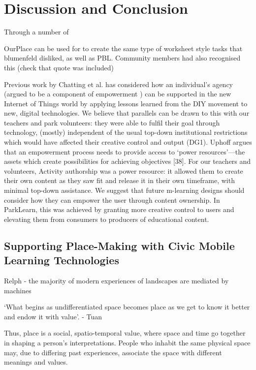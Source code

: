 \chapter{Discussion and Conclusion}

Through a number of 

OurPlace can be used for to create the same type of worksheet style tasks that blumenfeld disliked, as well as PBL. Community members had also recognised this (check that quote was included) 

Previous work by Chatting et al. \citep{Chatting2017} has considered how an individual’s agency (argued to be a component of empowerment \citep{Ibrahim2007}) can be supported in the new Internet of Things world by applying lessons learned from the DIY movement to new, digital technologies. We believe that parallels can be drawn to this with our teachers and park volunteers: they were able to fulfil their goal through technology, (mostly) independent of the usual top-down institutional restrictions which would have affected their creative control and output (DG1). Uphoff argues that an empowerment process needs to provide access to ‘power resources’—the assets which create possibilities for achieving objectives [38]. For our teachers and volunteers, Activity authorship was a power resource: it allowed them to create their own content as they saw fit and release it in their own timeframe, with minimal top-down assistance. We suggest that future m-learning designs should consider how they can empower the user through content ownership. In ParkLearn, this was achieved by granting more creative control to users and elevating them from consumers to producers of educational content.

\section{Supporting Place-Making with Civic Mobile Learning Technologies}

Relph - the majority of modern experiences of landscapes are mediated by machines

`What begins as undifferentiated space becomes place as we get to know it better and endow it with value'. - Tuan

Thus, place is a social, spatio-temporal value, where space and time go together in shaping a person’s interpretations. People who inhabit the same physical space may, due to differing past experiences, associate the space with different meanings and values.
 
